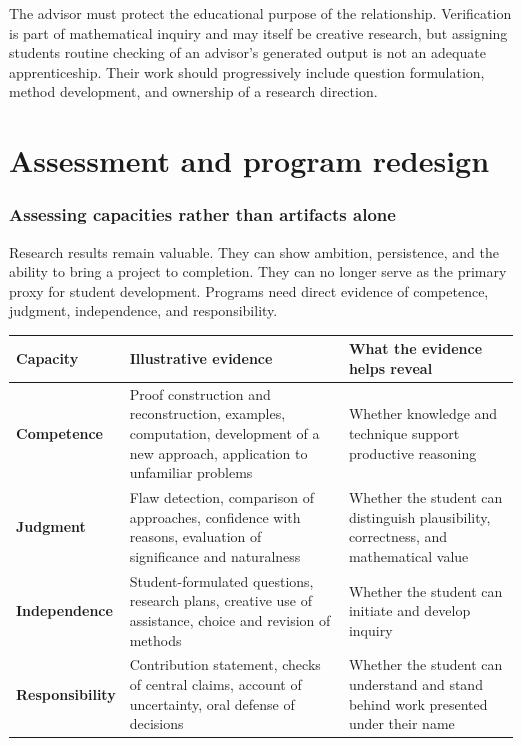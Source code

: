 \documentclass[11pt]{article}
\begin{document}
The advisor must protect the educational purpose of the relationship. Verification is
part of mathematical inquiry and may itself be creative research, but assigning students
routine checking of an advisor's generated output is not an adequate apprenticeship.
Their work should progressively include question formulation, method development, and
ownership of a research direction.

\clearpage
\part{Assessment and program redesign}

\section{Assessing capacities rather than artifacts alone}
\label{sec:assessing-capacities}

Research results remain valuable.  They can show ambition, persistence, and the ability
to bring a project to completion.  They can no longer serve as the primary proxy for
student development.  Programs need direct evidence of competence, judgment,
independence, and responsibility.

\begin{center}
\begin{tabularx}{\textwidth}{>{\bfseries}p{}Y Y}
\toprule
Capacity & Illustrative evidence & What the evidence helps reveal \\
\midrule
Competence & Proof construction and reconstruction, examples, computation, development
of a new approach, application to unfamiliar problems & Whether knowledge and technique support productive reasoning \\
Judgment & Flaw detection, comparison of approaches, confidence with reasons, evaluation
of significance and naturalness & Whether the student can distinguish plausibility,
correctness, and mathematical value \\
Independence & Student-formulated questions, research plans, creative use of assistance,
choice and revision of methods & Whether the student can initiate and develop inquiry \\
Responsibility & Contribution statement, checks of central claims, account of uncertainty,
oral defense of decisions & Whether the student can understand and stand behind work
presented under their name \\
\bottomrule
\end{tabularx}
\end{center}
\end{document}
